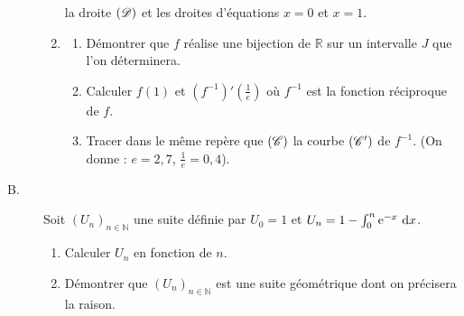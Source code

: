 \begin{description}
\begin{enumerate}
                              la droite $\D$ et les droites d'\'equations $x = 0$ et $x = 1$.
                        \item \begin{enumerate}
                                    \item D\'emontrer que $f$ r\'ealise une bijection de $\mathbb{R}$ sur un intervalle
                                          $J$ que l'on d\'eterminera.
                                    \item Calculer $f(1)$ et $(f^{-1})'\left( \frac{1}{e} \right)$ o\`u $f^{-1}$ est 
                                          la fonction r\'eciproque de $f$.
                                    \item Tracer dans le m\^eme rep\`ere que $(\mathscr{C})$ la courbe $(\mathscr{C}')$ de $f^{-1}$.
                                          (On donne : $e = 2,7$, $\frac{1}{e} = 0,4$).
                              \end{enumerate}
                  \end{enumerate}
            \item[B. ]
                  Soit $(U_n)_{n\in\mathbb{N}}$ une suite d\'efinie par $U_0 = 1$ et $U_n = 1 - \int_{0}^{n} \mathrm{e}^{-x} ~\mathrm{d}x$.
                  \begin{enumerate}
                        \item Calculer $U_n$ en fonction de $n$.
                        \item D\'emontrer que $(U_n)_{n\in\mathbb{N}}$ 
                              est une suite g\'eom\'etrique dont on pr\'ecisera la raison.
                  \end{enumerate}
      \end{description}










